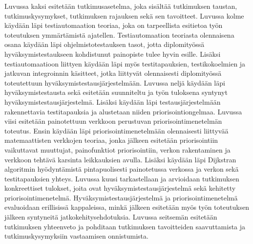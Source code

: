 Luvussa kaksi esitetään tutkimusasetelma, joka sisältää tutkimuksen taustan, tutkimuskysymykset, tutkimuksen rajauksen sekä sen tavoitteet.
Luvussa kolme käydään läpi testiautomaation teoriaa, joka on tarpeellista esitietoa työn toteutuksen ymmärtämistä ajatellen.
Testiautomaation teoriasta olennaisena osana käydään läpi ohjelmistotestauksen tasot, jotta diplomityössä hyväksymistestaukseen kohdistunut painopiste tulee hyvin esille.
Lisäksi testiautomaatioon liittyen käydään läpi myös testitapauksien, testikokoelmien ja jatkuvan integroinnin käsitteet, jotka liittyvät olennaisesti diplomityössä toteutettuun hyväksymistestausjärjestelmään.
Luvussa neljä käydään läpi hyväksymistestausta sekä esitetään suunniteltu ja työn tuloksena syntynyt hyväksymistestausjärjestelmä.
Lisäksi käydään läpi testausjärjestelmään rakennettavia testitapauksia ja alustetaan niiden priorisointiongelmaa.
Luvussa viisi esitetään painotettuun verkkoon perustuvan priorisointimenetelmän toteutus.
Ensin käydään läpi priorisointimenetelmään olennaisesti liittyvää matemaattisten verkkojen teoriaa, jonka jälkeen esitetään priorisointiin vaikuttavat muuttujat, painofunktiot priorisointiin, verkon rakentaminen ja verkkoon tehtävä karsinta leikkauksien avulla.
Lisäksi käydään läpi Dijkstran algoritmin hyödyntämistä pintapuolisesti painotetussa verkossa ja verkon sekä testitapauksien yhteys.
Luvussa kuusi tarkastellaan ja arvioidaan tutkimuksen konkreettiset tulokset, joita ovat hyväksymistestausjärjestelmä sekä kehitetty priorisointimenetelmä.
Hyväksymistestausjärjestelmä ja priorisointimenetelmä evaluoidaan erillisissä kappaleissa, minkä jälkeen esitetään myös työn toteutuksen jälkeen syntyneitä jatkokehitysehdotuksia.
Luvussa seitsemän esitetään tutkimuksen yhteenveto ja pohditaan tutkimuksen tavoitteiden saavuttamista ja tutkimuskysymyksiin vastaamisen onnistumista.
